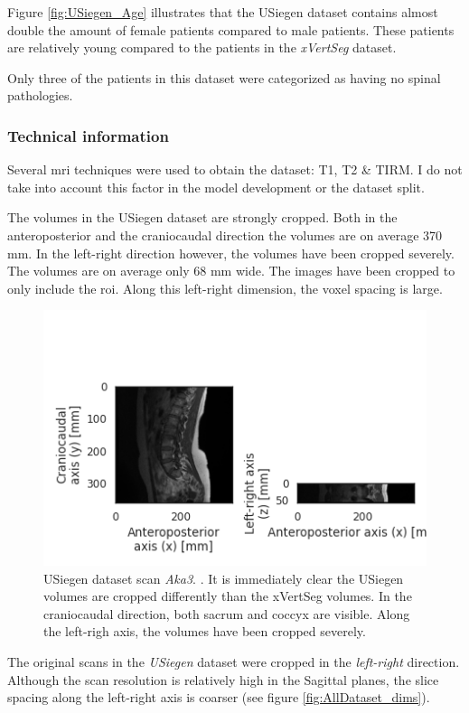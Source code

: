 Figure \ref{fig:USiegen_Age} illustrates that the USiegen dataset contains almost double the amount of female patients compared to male patients.
These patients are relatively young compared to the patients in the \textit{xVertSeg} dataset.

Only three of the patients in this dataset were categorized as having no spinal pathologies.

\subsubsection{Technical information}

Several \acrlong{mri} techniques were used to obtain the dataset: T1, T2 \& TIRM.
I do not take into account this factor in the model development or the dataset split.

The volumes in the USiegen dataset are strongly cropped. 
Both in the anteroposterior and the craniocaudal direction the volumes are on average 370 mm.
In the left-right direction however, the volumes have been cropped severely. The volumes are on average only 68 mm wide.
The images have been cropped to only include the \acrshort{roi}.
Along this left-right dimension, the voxel spacing is large. 

\begin{figure}
    \centering
    \includegraphics[width=.95\textwidth]{automated_graphs/USiegen_Aka3.png}
    \caption{USiegen dataset scan \textit{Aka3}. \label{fig:USiegen_Aka3}. It is immediately clear the USiegen volumes are cropped differently than the xVertSeg volumes.
    In the craniocaudal direction, both sacrum and coccyx are visible. Along the left-righ axis, the volumes have been cropped severely.}
\end{figure}

The original scans in the \textit{USiegen} dataset were cropped in the \textit{left-right} direction. 
Although the scan resolution is relatively high in the Sagittal planes, the slice spacing along the left-right axis is coarser (see figure \ref{fig:AllDataset_dims}).  